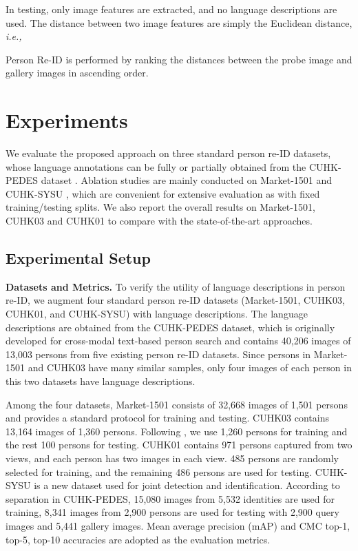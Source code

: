 \documentclass[runningheads]{llncs}
\begin{document}
In testing, only image features are extracted, and no language descriptions are used. The distance between two image features are simply the Euclidean distance, \emph{i.e.,}

Person Re-ID is performed by ranking the distances between the probe image and gallery images in ascending order.








\section{Experiments}


We evaluate the proposed approach on three standard person re-ID datasets, whose language annotations can be fully or partially obtained from the CUHK-PEDES dataset \cite{Lishuang_2017_CVPR}. Ablation studies are mainly conducted on Market-1501 \cite{zheng2015scalable} and CUHK-SYSU \cite{journals/corr/XiaoLWLW16}, which are  convenient for extensive evaluation as with fixed training/testing splits. We also report the overall results on Market-1501, CUHK03\cite{Li_2014_CVPR} and CUHK01\cite{li2012human} to compare with the state-of-the-art approaches.



\subsection{Experimental Setup} \label{Sec:Setup}



\noindent \textbf{Datasets and Metrics.} \quad  To verify the utility of language descriptions in person re-ID, we augment four standard person re-ID datasets (Market-1501, CUHK03, CUHK01, and CUHK-SYSU) with language descriptions. The language descriptions are obtained from the CUHK-PEDES  dataset, which is originally developed for cross-modal text-based person search and  contains 40,206 images of 13,003 persons from five existing person re-ID datasets. Since persons in Market-1501 and CUHK03 have many similar samples, only four images of each person in this two datasets have language descriptions. 

Among the four datasets, Market-1501 consists of 32,668 images of 1,501 persons and provides a standard protocol for training and testing.  CUHK03 contains 13,164 images of 1,360 persons. Following \cite{Li_2014_CVPR}, we use 1,260 persons for training and the rest 100 persons for testing. CUHK01 contains 971 persons captured from two views, and each person has two images in each view. 485 persons are randomly selected for training, and the remaining 486 persons are used for testing. CUHK-SYSU is a new dataset used for joint detection and identification. According to separation in CUHK-PEDES, 15,080 images from 5,532 identities are used for training, 8,341 images from 2,900 persons are used for testing with 2,900 query images and 5,441 gallery images. Mean average precision (mAP) and CMC top-1, top-5, top-10 accuracies are adopted as the evaluation metrics. 
\end{document}
